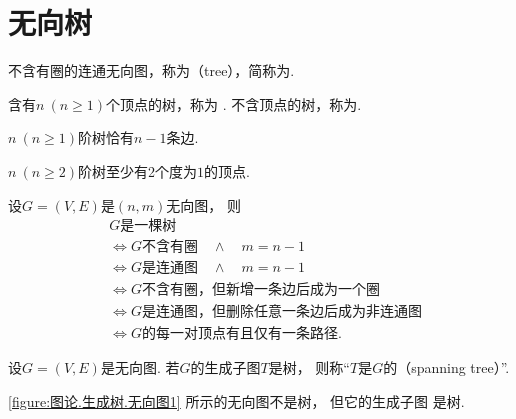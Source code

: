 \section{无向树}
\begin{definition}
不含有圈的连通无向图，称为（tree），简称为.
\end{definition}

含有\(n\ (n\geq1)\)个顶点的树，称为 .
不含顶点的树，称为.

\begin{property}
\(n\ (n\geq1)\)阶树恰有\(n-1\)条边.
\end{property}

\begin{property}
\(n\ (n\geq2)\)阶树至少有2个度为\(1\)的顶点.
\end{property}

\begin{theorem}
设\(G = (V,E)\)是\((n,m)\)无向图，
则\begin{align*}
	&\text{$G$是一棵树} \\
	&\iff \text{$G$不含有圈} \quad\land\quad m=n-1 \\
	&\iff \text{$G$是连通图} \quad\land\quad m=n-1 \\
	&\iff \text{$G$不含有圈，但新增一条边后成为一个圈} \\
	&\iff \text{$G$是连通图，但删除任意一条边后成为非连通图} \\
	&\iff \text{$G$的每一对顶点有且仅有一条路径}.
\end{align*}
\end{theorem}

\begin{definition}
设\(G = (V,E)\)是无向图.
若\(G\)的生成子图\(T\)是树，
则称“\(T\)是\(G\)的（spanning tree）”.
\end{definition}

\cref{figure:图论.生成树.无向图1} 所示的无向图不是树，
但它的生成子图  是树.

